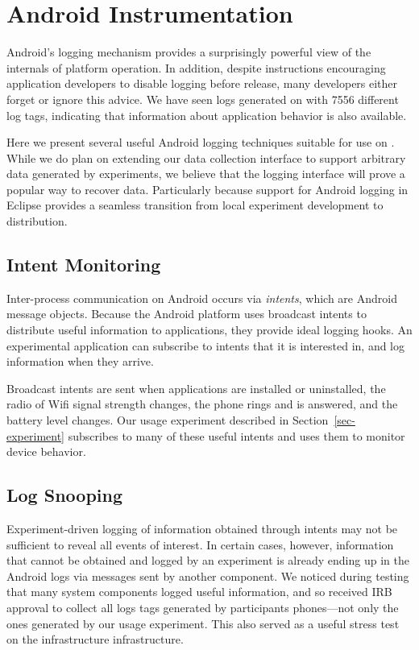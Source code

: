 \section{Android Instrumentation}
\label{sec-logging}


Android's logging mechanism provides a surprisingly powerful view of the
internals of platform operation. In addition, despite instructions
encouraging application developers to disable logging before release, many
developers either forget or ignore this advice. We have seen logs generated
on \PhoneLab{} with \num{7556} different log tags, indicating that
information about application behavior is also available.

Here we present several useful Android logging techniques suitable for use on
\PhoneLab{}. While we do plan on extending our data collection interface to
support arbitrary data generated by experiments, we believe that the logging
interface will prove a popular way to recover data. Particularly because
support for Android logging in Eclipse provides a seamless transition from
local experiment development to \PhoneLab{} distribution.

\vfill\eject
\subsection{Intent Monitoring}

Inter-process communication on Android occurs via \textit{intents}, which are
Android message objects. Because the Android platform uses broadcast intents
to distribute useful information to applications, they provide ideal logging
hooks. An experimental application can subscribe to intents that it is
interested in, and log information when they arrive.

Broadcast intents are sent when applications are installed or uninstalled,
the radio of Wifi signal strength changes, the phone rings and is answered,
and the battery level changes. Our usage experiment described in
Section~\ref{sec-experiment} subscribes to many of these useful intents and
uses them to monitor device behavior.

\subsection{Log Snooping}

Experiment-driven logging of information obtained through intents may not be
sufficient to reveal all events of interest. In certain cases, however,
information that cannot be obtained and logged by an experiment is already
ending up in the Android logs via messages sent by another component. We
noticed during testing that many system components logged useful information,
and so received IRB approval to collect all logs tags generated by
participants phones---not only the ones generated by our usage experiment.
This also served as a useful stress test on the \PhoneLab{} infrastructure
infrastructure.


